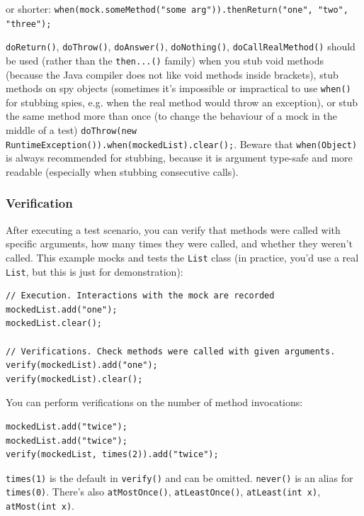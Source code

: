\documentclass[table, xcdraw]{article}%
\begin{document}
or shorter: \texttt{when(mock.someMethod("some arg")).thenReturn("one", "two", "three");}

\texttt{doReturn()}, \texttt{doThrow()}, \texttt{doAnswer()}, \texttt{doNothing()}, \texttt{doCallRealMethod()} should be used (rather than the \texttt{then...()} family) when you stub void methods (because the Java compiler does not like void methods inside brackets), stub methods on spy objects (sometimes it's impossible or impractical to use \texttt{when()} for stubbing spies, e.g. when the real method would throw an exception), or stub the same method more than once (to change the behaviour of a mock in the middle of a test) \texttt{doThrow(new RuntimeException()).when(mockedList).clear();}. Beware that \texttt{when(Object)} is always recommended for stubbing, because it is argument type-safe and more readable (especially when stubbing consecutive calls).

\subsubsection{Verification}

After executing a test scenario, you can verify that methods were called with specific arguments, how many times they were called, and whether they weren't called. This example mocks and tests the \texttt{List} class (in practice, you'd use a real \texttt{List}, but this is just for demonstration):

\begin{verbatim}
// Execution. Interactions with the mock are recorded
mockedList.add("one");
mockedList.clear();

// Verifications. Check methods were called with given arguments.
verify(mockedList).add("one");
verify(mockedList).clear();
\end{verbatim}

You can perform verifications on the number of method invocations:

\begin{verbatim}
mockedList.add("twice");
mockedList.add("twice");
verify(mockedList, times(2)).add("twice");
\end{verbatim}

\texttt{times(1)} is the default in \texttt{verify()} and can be omitted. \texttt{never()} is an alias for \texttt{times(0)}. There's also \texttt{atMostOnce()}, \texttt{atLeastOnce()}, \texttt{atLeast(int x)}, \texttt{atMost(int x)}.
\end{document}
